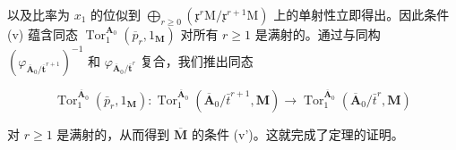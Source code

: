 以及比率为 \(x_{1}\) 的位似到 \(\bigoplus_{r\geqslant 0}(\mathfrak{x}^{r}\mathrm{M}/\mathfrak{x}^{r+1}\mathrm{M})\) 上的单射性立即得出。因此条件 (v) 蕴含同态 \(\operatorname{Tor}_{1}^{\mathbf{A}_{0}}(\overline{p}_{r},1_{\mathbf{M}})\) 对所有 \(r\geqslant 1\) 是满射的。通过与同构 \((\varphi_{\overline{\mathbf{A}}_{0}/\overline{\mathbf{t}}^{r+1}})^{-1}\) 和 \(\varphi_{\overline{\mathbf{A}}_{0}/\overline{\mathbf{t}}^{r}}\) 复合，我们推出同态

\[
\operatorname{Tor} _ {1} ^ {\overline {{\mathbf {A}}} _ {0}} \left(\bar {p} _ {r}, 1 _ {\mathbf {M}}\right): \operatorname{Tor} _ {1} ^ {\overline {{\mathbf {A}}} _ {0}} \left(\overline {{\mathbf {A}}} _ {0} / \bar {t} ^ {r + 1}, \mathbf {M}\right)\rightarrow \operatorname{Tor} _ {1} ^ {\overline {{\mathbf {A}}} _ {0}} \left(\overline {{\mathbf {A}}} _ {0} / \bar {t} ^ {r}, \mathbf {M}\right)
\]

对 \(r \geqslant 1\) 是满射的，从而得到 \(\overline{\mathbf{M}}\) 的条件 (v')。这就完成了定理的证明。

